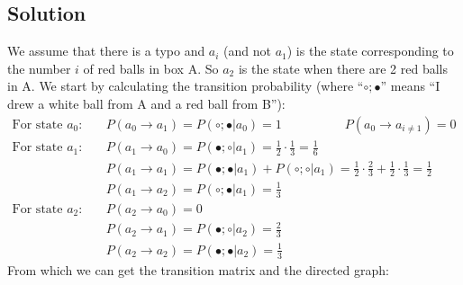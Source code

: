 \documentclass[../main.tex]{subfiles}
\begin{document}
\subsection{Solution}
We assume that there is a typo and $a_i$ (and not $a_1$) is the state corresponding to the number $i$ of red balls in box A. So $a_2$ is the state when there are 2 red balls in A.
We start by calculating the transition probability (where ``$\circ;\bullet$'' means ``I drew a white ball from A and a red ball from B''):
\begin{align}
    \text{For state $a_0$:} \quad \quad &P(a_0 \rightarrow a_1) =  P(\circ;\bullet|a_0) = 1\quad \quad\quad\quad\quad P(a_0 \rightarrow a_{i\neq 1}) = 0\\
    \text{For state $a_1$:}\quad \quad &P(a_1 \rightarrow a_0) =  P(\bullet;\circ|a_1) = \frac{1}{2}\cdot\frac{1}{3}= \frac{1}{6}\\
    & P(a_1 \rightarrow a_1) = P(\bullet;\bullet|a_1) + P(\circ;\circ|a_1) = \frac{1}{2}\cdot\frac{2}{3} + \frac{1}{2}\cdot\frac{1}{3} = \frac{1}{2}\\
    &P(a_1 \rightarrow a_2) =  P(\circ;\bullet|a_1) = \frac{1}{3}\\
    \text{For state $a_2$:}\quad \quad &P(a_2 \rightarrow a_0) = 0\\
    &P(a_2 \rightarrow a_1) =  P(\bullet;\circ|a_2) = \frac{2}{3}\\
    &P(a_2 \rightarrow a_2) =  P(\bullet;\bullet|a_2) = \frac{1}{3}
\end{align}
From which we can get the transition matrix and the directed graph:
\end{document}
